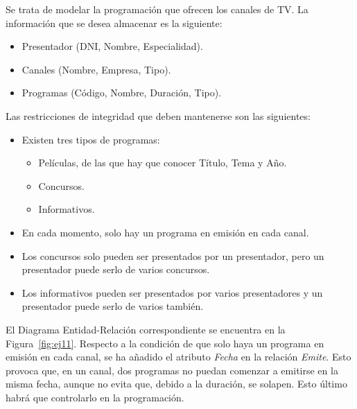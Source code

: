 \begin{ejercicio} \label{ej:11}
    Se trata de modelar la programación que ofrecen los canales de TV. La información que se desea almacenar
    es la siguiente:
    \begin{itemize}
        \item Presentador (DNI, Nombre, Especialidad).
        \item Canales (Nombre, Empresa, Tipo).
        \item Programas (Código, Nombre, Duración, Tipo).
    \end{itemize}
    Las restricciones de integridad que deben mantenerse son las siguientes:
    \begin{itemize}
        \item Existen tres tipos de programas:
        \begin{itemize}
            \item Películas, de las que hay que conocer Título, Tema y Año.
            \item Concursos.
            \item Informativos.
        \end{itemize}
        \item En cada momento, solo hay un programa en emisión en cada canal.
        \item Los concursos solo pueden ser presentados por un presentador, pero un presentador puede serlo de varios concursos.
        \item Los informativos pueden ser presentados por varios presentadores y un presentador puede serlo de varios también.
    \end{itemize}

    El Diagrama Entidad-Relación correspondiente se encuentra en la Figura~\ref{fig:ej11}.
    Respecto a la condición de que solo haya un programa en emisión en cada canal, se ha añadido el atributo \emph{Fecha} en la relación \emph{Emite}.
    Esto provoca que, en un canal, dos programas no puedan comenzar a emitirse en la misma fecha, aunque no evita que, debido a la duración, se solapen.
    Esto último habrá que controlarlo en la programación.
    \begin{figure}
        \centering
\end{figure}
\end{ejercicio}
